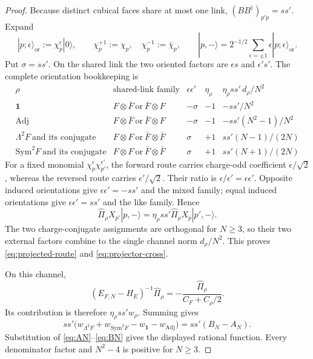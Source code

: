 \documentclass[11pt]{article}
\theoremstyle{plain}
\theoremstyle{definition}
\theoremstyle{remark}
\newcommand{\chk}[1]{}
\newcommand{\CF}{C_F}
\newcommand{\dg}{^{\dagger}}
\begin{document}
\begin{proof}
Because distinct cubical faces share at most one link,
$(BB\dg)_{p'p}=ss'$. Expand
\[
 |p;\epsilon\rangle_{\mathrm{or}}:=\chi_p^\epsilon|0\rangle,\qquad
 \chi_p^{+1}:=\chi_p,\quad\chi_p^{-1}:=\bar\chi_p,
 \qquad
 |p,-\rangle=2^{-1/2}\sum_{\epsilon=\pm1}
   \epsilon|p;\epsilon\rangle_{\mathrm{or}} .
\]
Put $\sigma=ss'$. On the shared link the two oriented factors are
$\epsilon s$ and $\epsilon's'$. The complete orientation bookkeeping is
\begin{equation}\label{eq:orientation-channel-table}
\begin{array}{c|c|c|c|c}
 \rho
 & \text{shared-link family}
 & \epsilon\epsilon'
 & \eta_\rho
 & \eta_\rho ss'\,d_\rho/N^2
 \\ \hline
 \mathbf1
 & F\otimes\bar F\ \text{or}\ \bar F\otimes F
 & -\sigma & -1
 & -ss'/N^2
 \\
 \mathrm{Adj}
 & F\otimes\bar F\ \text{or}\ \bar F\otimes F
 & -\sigma & -1
 & -ss'(N^2-1)/N^2
 \\
 \Lambda^2F\ \text{and its conjugate}
 & F\otimes F\ \text{or}\ \bar F\otimes\bar F
 & \sigma & +1
 & ss'(N-1)/(2N)
 \\
 \mathrm{Sym}^2F\ \text{and its conjugate}
 & F\otimes F\ \text{or}\ \bar F\otimes\bar F
 & \sigma & +1
 & ss'(N+1)/(2N)
\end{array}
\end{equation}
For a fixed monomial $\chi_p^\epsilon\chi_{p'}^{\epsilon'}$, the forward
route carries charge-odd coefficient $\epsilon/\sqrt2$, whereas the reversed
route carries $\epsilon'/\sqrt2$. Their ratio is
$\epsilon/\epsilon'=\epsilon\epsilon'$. Opposite induced orientations give
$\epsilon\epsilon'=-ss'$ and the mixed family; equal induced orientations
give $\epsilon\epsilon'=ss'$ and the like family. Hence
\[
 \widehat\Pi_\rho X_{p'}|p,-\rangle
 =\eta_\rho ss'\widehat\Pi_\rho X_p|p',-\rangle .
\]
The two charge-conjugate assignments are orthogonal for $N\ge3$, so their two
external factors combine to the single channel norm $d_\rho/N^2$.
This proves \eqref{eq:projected-route} and \eqref{eq:projector-cross}.

On this channel,
\[
 (E_{F,N}-H_E)^{-1}\widehat\Pi_\rho
 =-\frac{\widehat\Pi_\rho}{\CF+C_\rho/2}.
\]
Its contribution is therefore $\eta_\rho ss'w_\rho$. Summing gives
\[
 ss'\bigl(
 w_{\Lambda^2F}+w_{\mathrm{Sym}^2F}
 -w_{\mathbf1}-w_{\mathrm{Adj}}\bigr)
 =ss'(B_N-A_N).
\]
Substitution of \eqref{eq:AN}--\eqref{eq:BN} gives the displayed rational
function. Every denominator factor and $N^2-4$ is positive for $N\ge3$.
\end{proof}
\chk{t\_N = B\_N - A\_N}\chk{t\_N > 0 for N >= 3}
\end{document}
